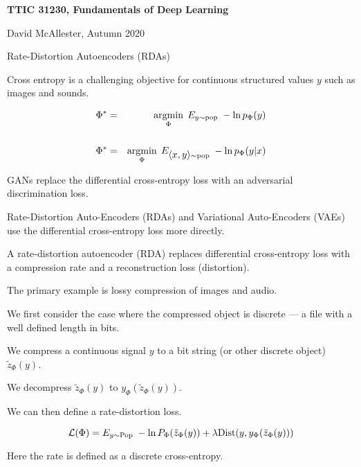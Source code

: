 





{\Huge

  \centerline{\bf TTIC 31230, Fundamentals of Deep Learning}
  \bigskip
  \centerline{David McAllester, Autumn 2020}
  \vfill
  \centerline{Rate-Distortion Autoencoders (RDAs)}
  \vfill
  \vfill


Cross entropy is a challenging objective for continuous structured values $y$ such as images and sounds.

\vfill
\begin{eqnarray*}
\Phi^* & = & \operatorname*{argmin}_\Phi \;E_{y \sim \mathrm{pop}}\;-\ln p_\Phi(y) \\
\\
\Phi^* & = & \operatorname*{argmin}_\Phi \;E_{{\mbox{$\langle x,y\rangle$}} \sim \mathrm{pop}}\;-\ln p_\Phi(y|x)
\end{eqnarray*}

\vfill
GANs replace the differential cross-entropy loss with an adversarial discrimination loss.

\vfill
Rate-Distortion Auto-Encoders (RDAs) and Variational Auto-Encoders (VAEs) use the differential cross-entropy loss more directly.


A rate-distortion autoencoder (RDA) replaces differential cross-entropy loss with a compression rate and
a reconstruction loss (distortion).

\vfill
The primary example is lossy compression of images and audio.

\vfill
We first consider the case where the compressed object is discrete --- a file with a well defined length in bits.


We compress a continuous signal $y$ to a bit string (or other discrete object) $\tilde{z}_\Phi(y)$.

\vfill
We decompress $\tilde{z}_\Phi(y)$ to $y_\Phi(\tilde{z}_\Phi(y))$.

\vfill
We can then define a rate-distortion loss.

{\color{red} $${\cal L}(\Phi) = E_{y \sim \mathrm{Pop}}\;-\ln P_\Phi(\tilde{z}_\Phi(y)) + \lambda \mathrm{Dist}(y,y_\Phi(\tilde{z}_\Phi(y)))$$}

\vfill
Here the rate is defined as a discrete cross-entropy.

}
